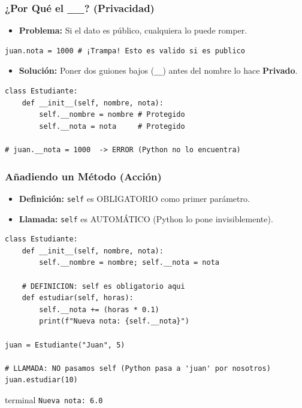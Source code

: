 \documentclass[11pt]{beamer}
\newcommand{\terminal}[1]{
    \vspace{-0.2em}
    \begin{beamercolorbox}[wd=\linewidth, sep=0.3em, rounded=false, shadow=false]{terminal}
    \texttt{#1}
    \end{beamercolorbox}
    \vspace{0.2em}
}
\begin{document}
\begin{frame}[fragile]\frametitle{¿Por Qué el \_\_? (Privacidad)}
\begin{itemize}
    \item \textbf{Problema:} Si el dato es público, cualquiera lo puede romper.
\end{itemize}
\begin{lstlisting}[basicstyle=\scriptsize]
juan.nota = 1000 # ¡Trampa! Esto es valido si es publico
\end{lstlisting}
\begin{itemize}
    \item \textbf{Solución:} Poner dos guiones bajos (\lstinline|__|) antes del nombre lo hace \textbf{Privado}.
\end{itemize}
\begin{lstlisting}[basicstyle=\scriptsize]
class Estudiante:
    def __init__(self, nombre, nota):
        self.__nombre = nombre # Protegido
        self.__nota = nota     # Protegido

# juan.__nota = 1000  -> ERROR (Python no lo encuentra)
\end{lstlisting}
\end{frame}

\begin{frame}[fragile]\frametitle{Añadiendo un Método (Acción)}
\begin{itemize}
    \item \textbf{Definición:} \lstinline|self| es OBLIGATORIO como primer parámetro.
    \item \textbf{Llamada:} \lstinline|self| es AUTOMÁTICO (Python lo pone invisiblemente).
\end{itemize}
\begin{lstlisting}[basicstyle=\scriptsize]
class Estudiante:
    def __init__(self, nombre, nota):
        self.__nombre = nombre; self.__nota = nota
        
    # DEFINICION: self es obligatorio aqui
    def estudiar(self, horas):
        self.__nota += (horas * 0.1)
        print(f"Nueva nota: {self.__nota}")

juan = Estudiante("Juan", 5)

# LLAMADA: NO pasamos self (Python pasa a 'juan' por nosotros)
juan.estudiar(10) 
\end{lstlisting}
\terminal{Nueva nota: 6.0}
\end{frame}
\end{document}

